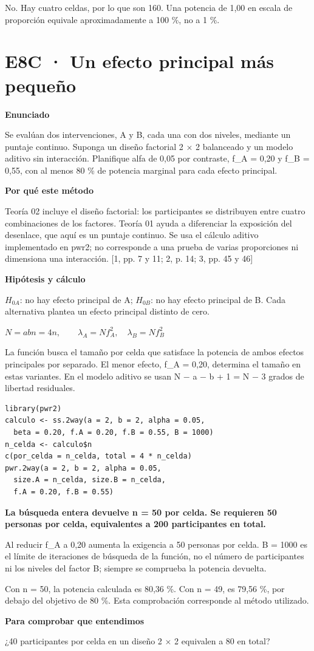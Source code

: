 \documentclass[10pt,a4paper]{article}
\newcommand{\etiqueta}[1]{\par{\bfseries\color{Blue}#1}\par}
\newcommand{\cajares}[1]{\par\colorbox{Pale}{\parbox{\dimexpr\linewidth-2\fboxsep}{\vspace{4pt}\textbf{\color{Navy}#1}\vspace{4pt}}}\par}
\begin{document}
{\small No. Hay cuatro celdas, por lo que son 160. Una potencia de 1,00 en escala de proporción equivale aproximadamente a 100 \%, no a 1 \%.}
\clearpage
\section*{E8C · Un efecto principal más pequeño}
\etiqueta{Enunciado}
Se evalúan dos intervenciones, A y B, cada una con dos niveles, mediante un puntaje continuo. Suponga un diseño factorial 2 \ensuremath{\times} 2 balanceado y un modelo aditivo sin interacción. Planifique alfa de 0,05 por contraste, f\_A = 0,20 y f\_B = 0,55, con al menos 80 \% de potencia marginal para cada efecto principal.
\etiqueta{Por qué este método}
Teoría 02 incluye el diseño factorial: los participantes se distribuyen entre cuatro combinaciones de los factores. Teoría 01 ayuda a diferenciar la exposición del desenlace, que aquí es un puntaje continuo. Se usa el cálculo aditivo implementado en pwr2; no corresponde a una prueba de varias proporciones ni dimensiona una interacción. [1, pp. 7 y 11; 2, p. 14; 3, pp. 45 y 46]
\etiqueta{Hipótesis y cálculo}
$H_{0A}$: no hay efecto principal de A; $H_{0B}$: no hay efecto principal de B. Cada alternativa plantea un efecto principal distinto de cero.

$N=abn=4n,\qquad \lambda_A=Nf_A^2,\quad \lambda_B=Nf_B^2$

La función busca el tamaño por celda que satisface la potencia de ambos efectos principales por separado. El menor efecto, f\_A = 0,20, determina el tamaño en estas variantes. En el modelo aditivo se usan N \ensuremath{-} a \ensuremath{-} b + 1 = N \ensuremath{-} 3 grados de libertad residuales.
\begin{Verbatim}
library(pwr2)
calculo <- ss.2way(a = 2, b = 2, alpha = 0.05,
  beta = 0.20, f.A = 0.20, f.B = 0.55, B = 1000)
n_celda <- calculo$n
c(por_celda = n_celda, total = 4 * n_celda)
pwr.2way(a = 2, b = 2, alpha = 0.05,
  size.A = n_celda, size.B = n_celda,
  f.A = 0.20, f.B = 0.55)
\end{Verbatim}
\cajares{La búsqueda entera devuelve n = 50 por celda. Se requieren 50 personas por celda, equivalentes a 200 participantes en total.}
Al reducir f\_A a 0,20 aumenta la exigencia a 50 personas por celda. B = 1000 es el límite de iteraciones de búsqueda de la función, no el número de participantes ni los niveles del factor B; siempre se comprueba la potencia devuelta.

{\small\color{Gray}Con n = 50, la potencia calculada es 80,36 \%. Con n = 49, es 79,56 \%, por debajo del objetivo de 80 \%. Esta comprobación corresponde al método utilizado.}
\etiqueta{Para comprobar que entendimos}
¿40 participantes por celda en un diseño 2 \ensuremath{\times} 2 equivalen a 80 en total?
\end{document}

